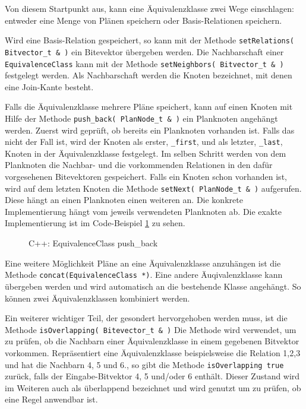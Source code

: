 Von diesem Startpunkt aus, kann eine Äquivalenzklasse zwei Wege einschlagen: entweder eine Menge von Plänen speichern oder Basis-Relationen speichern. 

Wird eine Basis-Relation gespeichert, so kann mit der Methode \texttt{setRelations( Bitvector\_t \& )} ein Bitevektor übergeben werden. Die Nachbarschaft einer \texttt{Equi\-valence\-Class} kann mit der Methode \texttt{set\-Neighbors( Bitvector\_t \& )} festgelegt werden. Als Nachbarschaft werden die Knoten bezeichnet, mit denen eine Join-Kante besteht.




Falls die Äquivalenzklasse mehrere Pläne speichert, kann auf einen Knoten mit Hilfe der Methode \texttt{push\_back( PlanNode\_t \& )} ein Planknoten angehängt werden. Zuerst wird geprüft, ob bereits ein Plan\-knoten vorhanden ist. Falls das nicht der Fall ist, wird der Knoten als erster, \texttt{\_first}, und als letzter, \texttt{\_last}, Knoten in der Äquivalenzklasse festgelegt. Im selben Schritt werden von dem Planknoten die Nachbar- und die vorkommenden Relationen in den dafür vorgesehenen Bitevektoren gespeichert. Falls ein Knoten schon vorhanden ist, wird auf dem letzten Knoten die Methode \texttt{setNext( PlanNode\_t \& )} aufgerufen. Diese hängt an einen Planknoten einen weiteren an. Die konkrete Implementierung hängt vom jeweils verwendeten Planknoten ab. Die exakte Implementierung ist im Code-Beispiel \ref{listing:Push-Back} zu sehen.


\begin{figure}[ht]

\caption{C++: EquivalenceClass push\_back}
\label{listing:Push-Back}
\end{figure}


Eine weitere Möglichkeit Pläne an eine Äquivalenzklasse anzuhängen ist die Methode \texttt{concat(EquivalenceClass *)}. Eine andere Äuqivalenzklasse kann übergeben werden und wird automatisch an die bestehende Klasse angehängt. So können zwei Äquivalenzklassen kombiniert werden.



Ein weiterer wichtiger Teil, der gesondert hervorgehoben werden muss, ist die Methode \texttt{isOverlapping( Bitevector\_t \& )} Die Methode wird  verwendet, um zu prüfen, ob die Nachbarn einer Äquivalenzklasse in einem gegebenen Bitvektor vorkommen. Repräsentiert eine Äquivalenzklasse beispielsweise die Relation 1,2,3 und hat die Nachbarn 4, 5 und 6., so gibt die Methode \texttt{isOverlapping true} zurück, falls der Eingabe-Bitvektor 4, 5 und/oder 6 enthält. Dieser Zustand wird im Weiteren auch als überlappend bezeichnet und wird genutzt um zu prüfen, ob eine Regel anwendbar ist.

